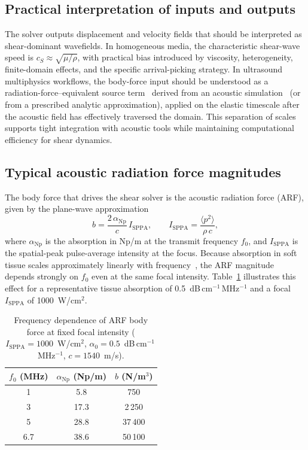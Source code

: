 \documentclass[11pt]{article}
\begin{document}
\subsection{Practical interpretation of inputs and outputs}
The solver outputs displacement and velocity fields that should be interpreted as
shear-dominant wavefields. In homogeneous media, the characteristic shear-wave speed
is $c_S\approx\sqrt{\mu/\rho}$, with practical bias introduced by viscosity,
heterogeneity, finite-domain effects, and the specific arrival-picking strategy.
In ultrasound multiphysics workflows, the body-force input should be understood as
a radiation-force–equivalent source term~\cite{palmeri2011radiation,rooney1973radiation} derived from an acoustic simulation~\cite{jensen1996field,treeby2010modeling,pinton2020fullwave} (or
from a prescribed analytic approximation), applied on the elastic timescale after
the acoustic field has effectively traversed the domain. This separation of scales
supports tight integration with acoustic tools while maintaining computational
efficiency for shear dynamics.

\subsection{Typical acoustic radiation force magnitudes}
\label{sec:arf_magnitudes}

The body force that drives the shear solver is the acoustic radiation force
(ARF), given by the plane-wave approximation~\cite{nyborg1965acoustic,torr1984acoustic}
\begin{equation}
  b = \frac{2\,\alpha_{\mathrm{Np}}}{c}\,I_{\mathrm{SPPA}},
  \qquad
  I_{\mathrm{SPPA}} = \frac{\langle p^2\rangle}{\rho\,c},
  \label{eq:arf_plane}
\end{equation}
where $\alpha_{\mathrm{Np}}$ is the absorption in Np/m at the transmit
frequency $f_0$, and $I_{\mathrm{SPPA}}$ is the spatial-peak
pulse-average intensity at the focus.  Because absorption in soft tissue
scales approximately linearly with
frequency~\cite{szabo2014diagnostic,duck1990physical}, the ARF magnitude
depends strongly on $f_0$ even at the same focal intensity.
Table~\ref{tab:arf_scaling} illustrates this effect for a representative
tissue absorption of 0.5~dB\,cm$^{-1}$\,MHz$^{-1}$ and a focal
$I_{\mathrm{SPPA}}$ of 1000~W/cm$^2$.

\begin{table}[H]
\centering
\caption{Frequency dependence of ARF body force at fixed focal intensity
  ($I_{\mathrm{SPPA}} = 1000$~W/cm$^2$,
   $\alpha_0 = 0.5$~dB\,cm$^{-1}$\,MHz$^{-1}$, $c = 1540$~m/s).}
\label{tab:arf_scaling}
\begin{tabular}{ccc}
\hline
$f_0$ (MHz) & $\alpha_{\mathrm{Np}}$ (Np/m) & $b$ (N/m$^3$) \\
\hline
1   &  5.8  & 750   \\
3   & 17.3  & 2\,250  \\
5   & 28.8  & 37\,400 \\
6.7 & 38.6  & 50\,100 \\
\hline
\end{tabular}
\end{table}
\end{document}
